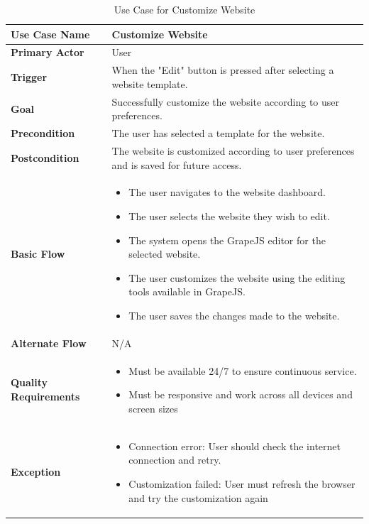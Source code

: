 \documentclass[12pt]{report}
\begin{document}
\begin{table}[h!]

\begin{tabular}{|p{3.5cm}|p{10cm}|}
\hline
\textbf{Use Case Name} & Customize Website \\ 
\hline
\textbf{Primary Actor} & User \\ 
\hline
\textbf{Trigger} & When the "Edit" button is pressed after selecting a website template. \\ 
\hline
\textbf{Goal} & Successfully customize the website according to user preferences. \\ 
\hline
\textbf{Precondition} & The user has selected a template for the website. \\ 
\hline
\textbf{Postcondition} & The website is customized according to user preferences and is saved for future access. \\ 
\hline

\textbf{Basic Flow} & 
\begin{itemize}
    \item The user navigates to the website dashboard.
    \item The user selects the website they wish to edit.
    \item The system opens the GrapeJS editor for the selected website.
    \item The user customizes the website using the editing tools available in GrapeJS.
    \item The user saves the changes made to the website.
\end{itemize} \\ 
\hline
\textbf{Alternate Flow} & N/A \\ 
\hline
\textbf{Quality Requirements} & 
\begin{itemize}
    \item Must be available 24/7 to ensure continuous service.
    \item Must be responsive and work across all devices and screen sizes
\end{itemize} \\ 
\hline
\textbf{Exception} & 
\begin{itemize}
    \item Connection error: User should check the internet connection and retry.
    \item Customization failed: User must refresh the browser and try the customization again
\end{itemize} \\ 
\hline
\end{tabular}

\caption{Use Case for Customize Website}
\end{table}
\end{document}
